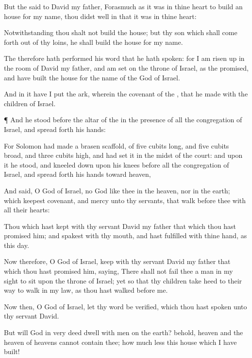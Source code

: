 {But the
{}
said to
David my
father, Forasmuch as it was in thine
heart to
build an
house for my
name, thou didst
well in that it was in thine
heart:

Notwithstanding thou shalt not
build the
house; but thy
son which shall come
forth out of thy
loins, he shall
build the
house for my
name.

The
{} therefore hath
performed his
word that he hath
spoken: for I am risen
up in the room of
David my
father, and am
set on the
throne of
Israel, as the
{}
promised, and have
built the
house for the
name of the
{}
God of
Israel.

And in
it have I
put the
ark, wherein
{} the
covenant of the
{}, that he
made with the
children of
Israel.


\par }{\PP {}¶ And he
stood
before the
altar of the
{} in the presence of all the
congregation of
Israel, and spread
forth his
hands:

For
Solomon had
made a
brasen
scaffold, of
five
cubits
long, and
five
cubits
broad, and
three
cubits
high, and had
set it in the
midst of the
court: and upon it he
stood, and kneeled
down upon his
knees before all the
congregation of
Israel, and spread
forth his
hands toward
heaven,

And
said, O
{}
God of
Israel,
{} no
God like thee in the
heaven, nor in the
earth; which
keepest
covenant, and
{}
mercy unto thy
servants, that
walk
before thee with all their
hearts:

Thou which hast
kept with thy
servant
David my
father that which thou hast
promised him; and
spakest with thy
mouth, and hast
fulfilled
{} with thine
hand, as
{} this
day.

Now therefore, O
{}
God of
Israel,
keep with thy
servant
David my
father that which thou hast
promised him,
saying, There shall not
fail thee a
man in my
sight to
sit upon the
throne of
Israel; yet
so that thy
children take
heed to their
way to
walk in my
law, as thou hast
walked
before me.

Now then, O
{}
God of
Israel, let thy
word be
verified, which thou hast
spoken unto thy
servant
David.

But will
God in very
deed
dwell with
men on the
earth? behold,
heaven and the
heaven of
heavens cannot
contain thee; how much less this
house which I have
built!

}
